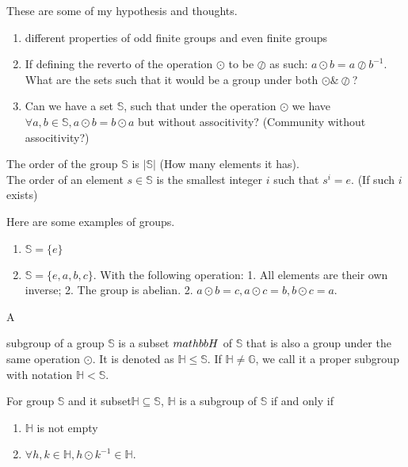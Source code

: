 \documentclass[../note.tex]{subfiles}
\begin{document}
\begin{hypothesis}
	These are some of my hypothesis and thoughts.
	\begin{enumerate}
		\item different properties of odd finite groups and even finite groups
		\item If defining the reverto of the operation $\odot $ to be $\oslash $ as such: $a \odot b = a \oslash b^{-1}$. What are the sets such that it would be a group under both $\odot \& \oslash$?
		\item Can we have a set $\mathbb{S}$, such that under the operation $\odot $ we have $\forall a, b \in \mathbb{S}, a \odot b = b \odot  a$ but without associtivity? (Community without associtivity?)
	\end{enumerate}
\end{hypothesis}
\begin{definition}
The order of the group $\mathbb{S}$ is $|\mathbb{S}|$ (How many elements it has). \\
The order of an element $s \in \mathbb{S}$ is the smallest integer $i$ such that $s^i = e.$ (If such $i$ exists)
\end{definition}

Here are some examples of groups. 
\begin{enumerate}
	\item $\mathbb{S}=\{e\}$
	\item $\mathbb{S} = \{e, a, b, c\}.$ With the following operation:
		1. All elements are their own inverse; 
		2. The group is abelian.
		2. $a \odot b = c, a \odot c = b, b \odot c = a$.
\end{enumerate}

\begin{definition}[Subgroup]
	\hypertarget{def:subgroup}{A} subgroup of a group $\mathbb{S}$ is a subset $\\mathbb{H}$ of $\mathbb{S}$ that is also a group under the same operation $\odot$. It is denoted as $ \mathbb{H}\leq \mathbb{S}$. If $\mathbb{H} \neq \mathbb{G}$, we call it a proper subgroup with notation $\mathbb{H}< \mathbb{S}$.
\end{definition}

\begin{theorem} 
	For group $\mathbb{S}$ and it subset$\mathbb{H} \subseteq \mathbb{S}$, $\mathbb{H}$ is a subgroup of $\mathbb{S}$ if and only if 
	\begin{enumerate}
		\item $\mathbb{H}$ is not empty 
		\item $\forall h,k \in \mathbb{H}, h\odot k^{-1} \in \mathbb{H}$.
	\end{enumerate}
\end{theorem}
\end{document}
